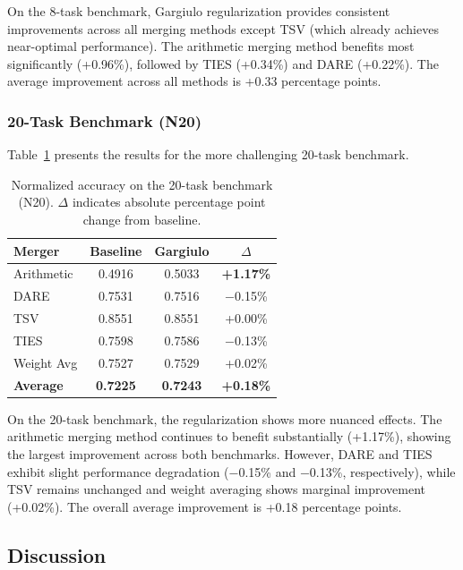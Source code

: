 On the 8-task benchmark, Gargiulo regularization provides consistent improvements across all merging methods except TSV (which already achieves near-optimal performance). The arithmetic merging method benefits most significantly (+0.96\%), followed by TIES (+0.34\%) and DARE (+0.22\%). The average improvement across all methods is +0.33 percentage points.

\subsubsection{20-Task Benchmark (N20)}

Table~\ref{tab:gargiulo_n20} presents the results for the more challenging 20-task benchmark.

\begin{table}[h]
\centering
\caption{Normalized accuracy on the 20-task benchmark (N20). $\Delta$ indicates absolute percentage point change from baseline.}
\label{tab:gargiulo_n20}
\begin{tabular}{lccc}
\toprule
\textbf{Merger} & \textbf{Baseline} & \textbf{Gargiulo} & \textbf{$\Delta$} \\
\midrule
Arithmetic & 0.4916 & 0.5033 & \textbf{+1.17\%} \\
DARE       & 0.7531 & 0.7516 & $-$0.15\% \\
TSV        & 0.8551 & 0.8551 & +0.00\% \\
TIES       & 0.7598 & 0.7586 & $-$0.13\% \\
Weight Avg & 0.7527 & 0.7529 & +0.02\% \\
\midrule
\textbf{Average} & \textbf{0.7225} & \textbf{0.7243} & \textbf{+0.18\%} \\
\bottomrule
\end{tabular}
\end{table}

On the 20-task benchmark, the regularization shows more nuanced effects. The arithmetic merging method continues to benefit substantially (+1.17\%), showing the largest improvement across both benchmarks. However, DARE and TIES exhibit slight performance degradation ($-$0.15\% and $-$0.13\%, respectively), while TSV remains unchanged and weight averaging shows marginal improvement (+0.02\%). The overall average improvement is +0.18 percentage points.

\subsection{Discussion}

